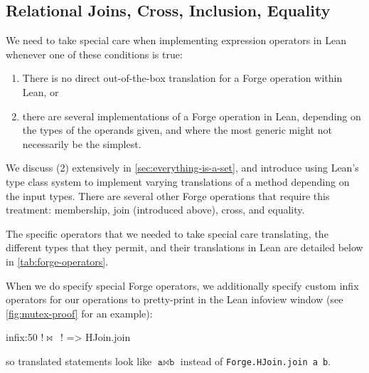 \subsection{Relational Joins, Cross, Inclusion, Equality}\label{sec:join-cross-subset}

We need to take special care when implementing expression operators in Lean whenever one of these conditions is true: 
\begin{enumerate}[(1)]
  \item There is no direct out-of-the-box translation for a Forge operation within Lean, or
  \item there are several implementations of a Forge operation in Lean, depending on the types of the operands given, and where the most generic might not necessarily be the simplest. 
\end{enumerate}
We discuss (2) extensively in \cref{sec:everything-is-a-set}, and introduce using Lean's type class system to implement varying translations of a method depending on the input types. There are several other Forge operations that require this treatment: membership, join (introduced above), cross, and equality. 

The specific operators that we needed to take special care translating, the different types that they permit, and their translations in Lean are detailed below in \cref{tab:forge-operators}. 

When we do specify special Forge operators, we additionally specify custom infix operators for our operations to pretty-print in the Lean infoview window (see \cref{fig:mutex-proof} for an example): 
\begin{leanimpl*}
  infix:50 !\texttt{\textquotedbl }$\bowtie$\texttt{ \textquotedbl}! => HJoin.join
\end{leanimpl*}
so translated statements look like $\texttt{a}\bowtie\texttt{b}$ instead of \texttt{Forge.HJoin.join a b}. 

